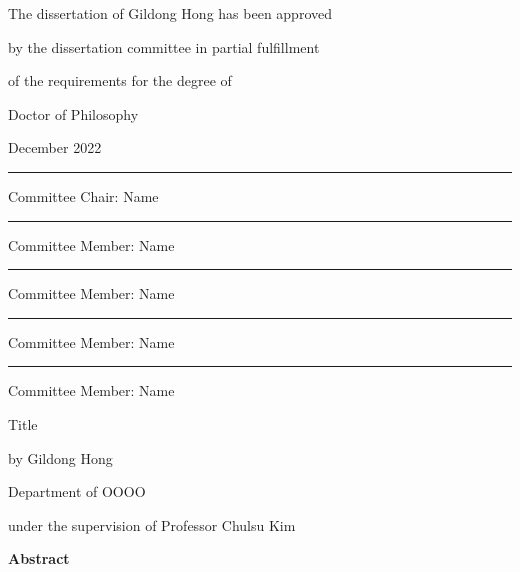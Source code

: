 \documentclass[11pt]{report}
\begin{document}
\newpage
\begin{center}
\Large
The dissertation of Gildong Hong has been approved \par
by the dissertation committee in partial fulfillment\par
of the requirements for the degree of \par
Doctor of Philosophy  
\par\vspace{1cm}
\large December 2022 %
\par\vspace{2cm}
\rule{.6\textwidth}{0.4pt}\par %
\Large
Committee Chair: Name
\par\vspace{1cm}
\rule{.6\textwidth}{0.4pt}\par %
Committee Member: Name
\par\vspace{1cm}
\rule{.6\textwidth}{0.4pt}\par %
Committee Member: Name 
\par\vspace{1cm}
\rule{.6\textwidth}{0.4pt}\par %
Committee Member: Name 
\par\vspace{1cm}
\rule{.6\textwidth}{0.4pt}\par %
Committee Member: Name 
\par\vspace{1cm} %
\end{center}

\newpage 
{} %
\begin{center}
\LARGE Title %
\par\vspace{20pt}

\normalsize \doublespacing
by Gildong Hong\par %
Department of OOOO\par
under the supervision of Professor Chulsu Kim %
\par\vspace{20pt}
\large \textbf{Abstract}
\end{center}
\end{document}

